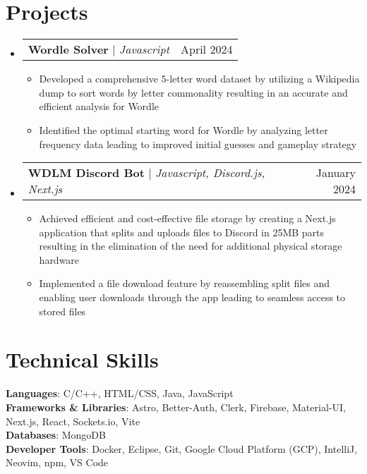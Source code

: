 \documentclass[letterpaper,11pt]{article}
\makeatletter
\newcommand{\resumeItem}[1]{
  \item\small{
    {#1 \vspace{-2pt}}
  }
}
\newcommand{\resumeProjectHeading}[2]{
    \item
    \begin{tabular*}{0.97\textwidth}{l@{\extracolsep{\fill}}r}
      \small#1 & #2 \\
    \end{tabular*}\vspace{-7pt}
}
\newcommand{\resumeSubHeadingListStart}{\begin{itemize}[leftmargin=0.15in, label={}]}
\newcommand{\resumeSubHeadingListEnd}{\end{itemize}}
\newcommand{\resumeItemListStart}{\begin{itemize}}
\newcommand{\resumeItemListEnd}{\end{itemize}\vspace{-5pt}}
\makeatother
\begin{document}
\section{Projects}
    \resumeSubHeadingListStart
      \resumeProjectHeading
          {\textbf{Wordle Solver} $|$ \emph{Javascript}}{April 2024}
          \resumeItemListStart
            \resumeItem{Developed a comprehensive 5-letter word dataset by utilizing a Wikipedia dump to sort words by letter commonality resulting in an accurate and efficient analysis for Wordle}
            \resumeItem{Identified the optimal starting word for Wordle by analyzing letter frequency data leading to improved initial guesses and gameplay strategy}
          \resumeItemListEnd
      \resumeProjectHeading
          {\textbf{WDLM Discord Bot} $|$ \emph{Javascript, Discord.js, Next.js}}{January 2024}
          \resumeItemListStart
            \resumeItem{Achieved efficient and cost-effective file storage by creating a Next.js application that splits and uploads files to Discord in 25MB parts resulting in the elimination of the need for additional physical storage hardware}
            \resumeItem{Implemented a file download feature by reassembling split files and enabling user downloads through the app leading to seamless access to stored files}
          \resumeItemListEnd
    \resumeSubHeadingListEnd



%
\section{Technical Skills}
 \begin{itemize}[leftmargin=0.15in, label={}]
    \small{\item{
     \textbf{Languages}{: C/C++, HTML/CSS, Java, JavaScript} \\
     \textbf{Frameworks \& Libraries}{: Astro, Better-Auth, Clerk, Firebase, Material-UI, Next.js, React, Sockets.io, Vite} \\
     \textbf{Databases}{: MongoDB} \\
     \textbf{Developer Tools}{: Docker, Eclipse, Git, Google Cloud Platform (GCP), IntelliJ, Neovim, npm, VS Code} 
    }}
\end{itemize}




\end{document}
